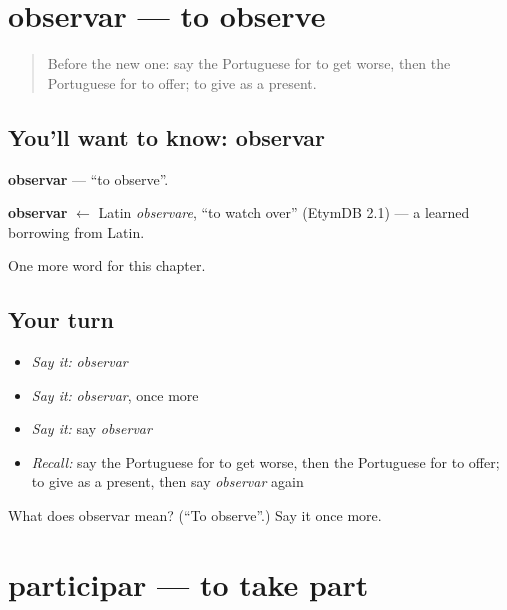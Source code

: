 \section[observar]{observar — to observe}

\label{lesson:PT-C205-observar}



\begin{quote}
Before the new one: say the Portuguese for to get worse, then the Portuguese for to offer; to give as a present.
\end{quote}

\subsection*{You'll want to know: observar}
\textbf{observar} — \textquotedblleft{}to observe\textquotedblright{}.

\begin{cousinweb}
\textbf{observar} $\leftarrow$ Latin \emph{observare}, \textquotedblleft{}to watch over\textquotedblright{} (EtymDB 2.1) — a learned borrowing from Latin.
\end{cousinweb}

\begin{grammarlens}[title={What you've built}]
One more word for this chapter.
\end{grammarlens}

\subsection*{Your turn}
\begin{itemize}
\raggedright
  \item \emph{Say it:} \emph{observar}
  \item \emph{Say it:} \emph{observar}, once more
  \item \emph{Say it:} say \emph{observar}
  \item \emph{Recall:} say the Portuguese for to get worse, then the Portuguese for to offer; to give as a present, then say \emph{observar} again
\end{itemize}

\begin{tcolorbox}[breakable,colback=teal!4,colframe=teal!35!black,title={Before you move on}]
What does observar mean? (\textquotedblleft{}To observe\textquotedblright{}.) Say it once more.
\end{tcolorbox}
\section[participar]{participar — to take part}

